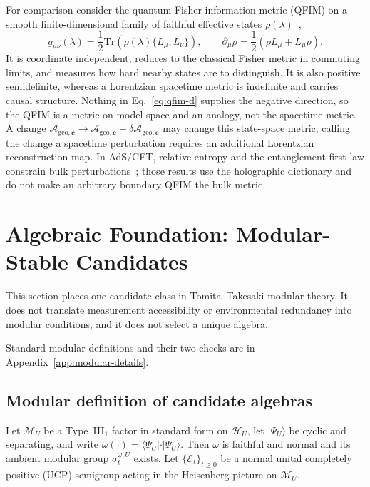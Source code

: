 \documentclass[12pt,a4paper]{article}
\begin{document}
For comparison consider the quantum Fisher information metric (QFIM) on a smooth finite-dimensional family of faithful effective states $\rho(\lambda)$~\cite{Petz1996,Bengtsson2006},
\begin{equation}
g_{\mu\nu}(\lambda) = \frac{1}{2} \text{Tr}\left( \rho(\lambda) \{ L_\mu, L_\nu \} \right),
\qquad
\partial_\mu \rho = \frac{1}{2}(\rho L_\mu + L_\mu \rho).
\label{eq:qfim-d}
\end{equation}
It is coordinate independent, reduces to the classical Fisher metric in commuting limits, and measures how hard nearby states are to distinguish. It is also positive semidefinite, whereas a Lorentzian spacetime metric is indefinite and carries causal structure. Nothing in Eq.~\eqref{eq:qfim-d} supplies the negative direction, so the QFIM is a metric on model space and an analogy, not the spacetime metric. A change $\mathcal{A}_{\mathrm{geo},\mathbf{c}} \to \mathcal{A}_{\mathrm{geo},\mathbf{c}} + \delta\mathcal{A}_{\mathrm{geo},\mathbf{c}}$ may change this state-space metric; calling the change a spacetime perturbation requires an additional Lorentzian reconstruction map. In AdS/CFT, relative entropy and the entanglement first law constrain bulk perturbations~\cite{Lashkari2014,Faulkner2014}; those results use the holographic dictionary and do not make an arbitrary boundary QFIM the bulk metric.


\section{Algebraic Foundation: Modular-Stable Candidates}
\label{sec:modular}

This section places one candidate class in Tomita--Takesaki modular theory. It does not translate measurement accessibility or environmental redundancy into modular conditions, and it does not select a unique algebra.

Standard modular definitions and their two checks are in Appendix~\ref{app:modular-details}.

\subsection{Modular definition of candidate algebras}
\label{sec:modular-def}

Let $\mathcal M_U$ be a Type~III$_1$ factor in standard form on $\mathcal H_U$, let $|\Psi_U\rangle$ be cyclic and separating, and write $\omega(\cdot)=\langle\Psi_U|\cdot|\Psi_U\rangle$. Then $\omega$ is faithful and normal and its ambient modular group $\sigma_t^{\omega,U}$ exists. Let $\{\mathcal E_t\}_{t\ge0}$ be a normal unital completely positive (UCP) semigroup acting in the Heisenberg picture on $\mathcal M_U$.
\end{document}
